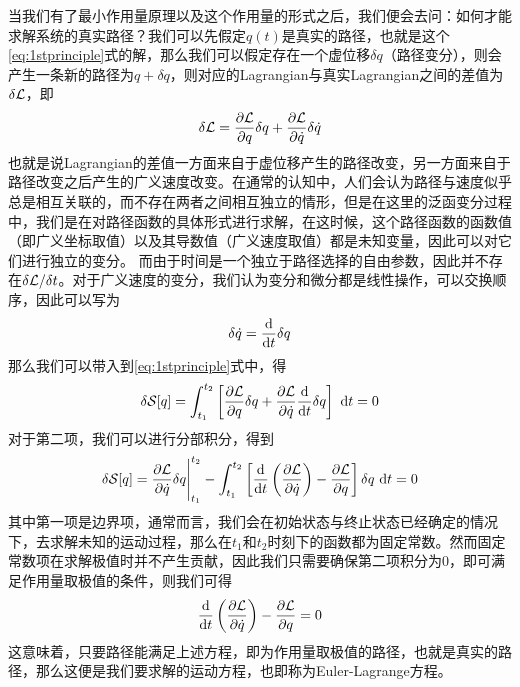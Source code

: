 当我们有了最小作用量原理以及这个作用量的形式之后，我们便会去问：如何才能求解系统的真实路径？我们可以先假定$q(t)$是真实的路径，也就是这个\eqref{eq:1stprinciple}式的解，那么我们可以假定存在一个虚位移$\delta q$（路径变分），则会产生一条新的路径为$q+\delta q$，则对应的Lagrangian与真实Lagrangian之间的差值为$\delta\mathcal{L}$，即
\begin{equation}
    \delta\mathcal{L} = \frac{\partial\mathcal{L}}{\partial q}\delta q + \frac{\partial\mathcal{L}}{\partial \dot q}\delta \dot q 
\end{equation}
也就是说Lagrangian的差值一方面来自于虚位移产生的路径改变，另一方面来自于路径改变之后产生的广义速度改变。在通常的认知中，人们会认为路径与速度似乎总是相互关联的，而不存在两者之间相互独立的情形，但是在这里的泛函变分过程中，我们是在对路径函数的具体形式进行求解，在这时候，这个路径函数的函数值（即广义坐标取值）以及其导数值（广义速度取值）都是未知变量，因此可以对它们进行独立的变分。
而由于时间是一个独立于路径选择的自由参数，因此并不存在$\delta\mathcal{L}/\delta t$。对于广义速度的变分，我们认为变分和微分都是线性操作，可以交换顺序，因此可以写为
\begin{equation}
    \delta\dot q = \frac{\mathrm{d} }{\mathrm{d} t}\delta q
\end{equation}
那么我们可以带入到\eqref{eq:1stprinciple}式中，得
\begin{equation}
    \delta\mathcal{S}[q] = \int_{t_1}^{t_2}\left[ \frac{\partial\mathcal{L}}{\partial q}\delta q + \frac{\partial\mathcal{L}}{\partial \dot q}\frac{\mathrm{d} }{\mathrm{d} t}\delta q  \right] ~\mathrm{d} t=0
\end{equation}
对于第二项，我们可以进行分部积分，得到
\begin{equation}
    \delta\mathcal{S}[q] = \frac{\partial\mathcal{L}}{\partial \dot q}\delta q\Bigg|_{t_1}^{t_2}- \int_{t_1}^{t_2}\left[ \frac{\mathrm{d} }{\mathrm{d} t} \left(\frac{\partial\mathcal{L}}{\partial \dot{q}} \right) -\frac{\partial\mathcal{L}}{\partial q}  \right] \delta q~\mathrm{d} t=0
\end{equation}
其中第一项是边界项，通常而言，我们会在初始状态与终止状态已经确定的情况下，去求解未知的运动过程，那么在$t_1$和$t_2$时刻下的函数都为固定常数。然而固定常数项在求解极值时并不产生贡献，因此我们只需要确保第二项积分为0，即可满足作用量取极值的条件，则我们可得
\begin{equation}
    \frac{\mathrm{d}}{\mathrm{d} t} \left(\frac{\partial\mathcal{L}}{\partial \dot{q}} \right)-\frac{\partial\mathcal{L}}{\partial q}  = 0
\end{equation}
这意味着，只要路径能满足上述方程，即为作用量取极值的路径，也就是真实的路径，那么这便是我们要求解的运动方程，也即称为Euler-Lagrange方程。

